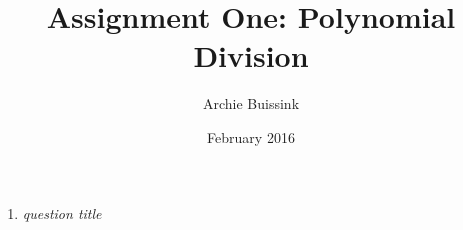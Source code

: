\documentclass{article}
\title{Assignment One: Polynomial Division}
\author{Archie Buissink}
\date{February 2016}
\begin{document}
\maketitle
\begin{enumerate} %
\item \emph{question title}
    \begin{align*}
    \end{align*}
\end{enumerate}
\end{document}
